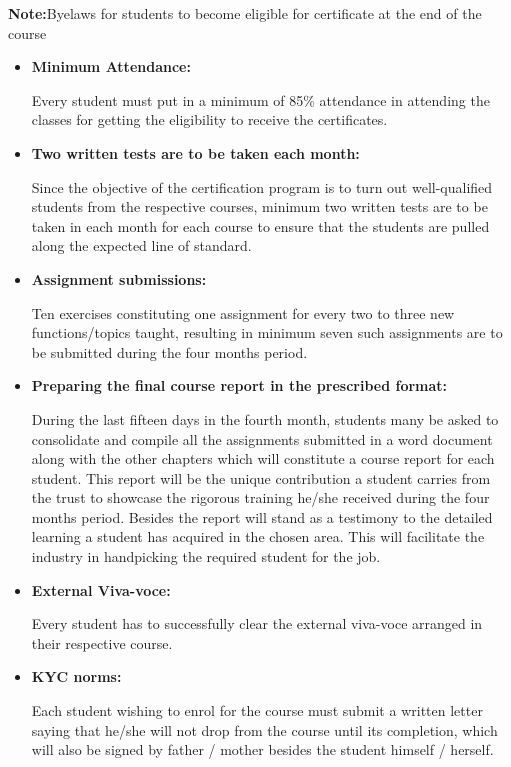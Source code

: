 \documentclass[12pt]{article}
\begin{document}
\begin{flushleft}
\textbf{ Note:}Byelaws for students to become eligible for certificate at the end of the course
\end{flushleft}
 \begin{itemize}
  \item \textbf{Minimum Attendance:}
 
  Every student must put in a minimum of 85\% attendance in attending the classes for getting the
  eligibility to receive the certificates.

  \item \textbf{Two written tests are to be taken each month:}
  
  Since the objective of the certification program is to turn out well-qualified students from the respective courses, minimum two written tests are to be taken in each month for each course to ensure that the students are pulled along the expected line of standard.
  
  \item \textbf{Assignment submissions:} 
  
Ten exercises constituting one assignment for every two to three new functions/topics taught, resulting in minimum seven such assignments are to be submitted during the four months period.  
  
   \item  \textbf{Preparing the final course report in the prescribed format:}
   
   During the last fifteen days in the fourth month, students many be asked to consolidate and compile all the assignments submitted in a word document along with the other chapters which will constitute a course report for each student. This report will be the unique contribution a student carries from the trust to showcase the rigorous training he/she received during the four months period. Besides the report will stand as a testimony to the detailed learning a student has acquired in the chosen area. This will facilitate the industry in handpicking the required student for the job.

   \item \textbf{External Viva-voce:} 
   
   Every student has to successfully clear the external viva-voce arranged in their respective course.
   
   \item \textbf{KYC norms:}
   
   Each student wishing to enrol for the course must submit a written letter saying that he/she will not drop from the course until its completion, which will also be signed by father / mother besides the student himself / herself.
   

\end{itemize}
\end{document}
